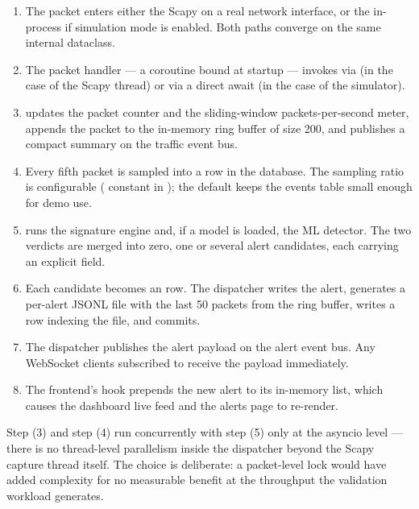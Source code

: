 \begin{enumerate}
  \item The packet enters either the Scapy  on a
    real network interface, or the in-process 
    if simulation mode is enabled. Both paths converge on the same
    internal  dataclass.
  \item The packet handler --- a coroutine bound at startup ---
    invokes  via
     (in the case of the
    Scapy thread) or via a direct await (in the case of the
    simulator).
  \item {} updates the packet counter and
    the sliding-window packets-per-second meter, appends the packet
    to the in-memory ring buffer of size 200, and publishes a
    compact summary on the traffic event bus.
  \item Every fifth packet is sampled into a 
    row in the database. The sampling ratio is configurable
    ( constant in ); the
    default keeps the events table small enough for demo use.
  \item {} runs the signature engine and,
    if a model is loaded, the ML detector. The two verdicts are
    merged into zero, one or several alert candidates, each carrying
    an explicit  field.
  \item Each candidate becomes an  row. The dispatcher
    writes the alert, generates a per-alert JSONL file with the
    last 50 packets from the ring buffer, writes a 
    row indexing the file, and commits.
  \item The dispatcher publishes the alert payload on the alert
    event bus. Any WebSocket clients subscribed to
     receive the payload immediately.
  \item The frontend's  hook prepends the new
    alert to its in-memory list, which causes the dashboard live
    feed and the alerts page to re-render.
\end{enumerate}

Step (3) and step (4) run concurrently with step (5) only at the
asyncio level --- there is no thread-level parallelism inside the
dispatcher beyond the Scapy capture thread itself. The choice is
deliberate: a packet-level lock would have added complexity for no
measurable benefit at the throughput the validation workload
generates.

